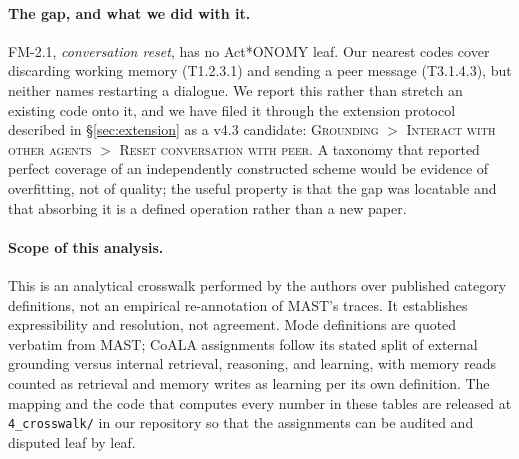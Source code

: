 \paragraph{The gap, and what we did with it.}
FM-2.1, \emph{conversation reset}, has no Act*ONOMY leaf. Our
nearest codes cover discarding working memory (T1.2.3.1) and sending a peer
message (T3.1.4.3), but neither names restarting a dialogue. We report this
rather than stretch an existing code onto it, and we have filed it through the
extension protocol described in \S\ref{sec:extension} as a v4.3 candidate:
\textsc{Grounding $>$ Interact with other agents $>$ Reset conversation with
peer}. A taxonomy that reported perfect coverage of an independently
constructed scheme would be evidence of overfitting, not of quality; the
useful property is that the gap was locatable and that absorbing it is a
defined operation rather than a new paper.

\paragraph{Scope of this analysis.}
This is an analytical crosswalk performed by the authors over published
category definitions, not an empirical re-annotation of MAST's traces. It
establishes expressibility and resolution, not agreement. Mode definitions are
quoted verbatim from MAST; CoALA assignments follow its stated split of
external grounding versus internal retrieval, reasoning, and learning, with
memory reads counted as retrieval and memory writes as learning per its own
definition. The mapping and the code that computes every number in these
tables are released at \texttt{4\_crosswalk/} in our repository so that the
assignments can be audited and disputed leaf by leaf.

